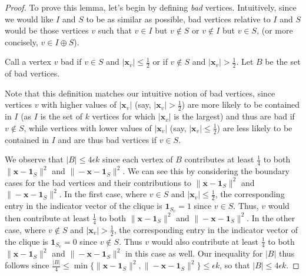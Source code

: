 \documentclass{article}
\begin{document}
\begin{proof}
    To prove this lemma, let's begin by defining \emph{bad} vertices.
    Intuitively, since we would like $I$ and $S$ to be as similar as possible, bad vertices relative to $I$ and $S$ would be those vertices
    $v$ such that $v \in I$ but $v \notin S$ or $v \notin I$ but $v \in S$,
    (or more concisely, $v \in I \oplus S$).
    \begin{definition}
        Call a vertex $v$ bad if $v \in S$ and $|\mathbf{x}_{v}| \leq \frac{1}{2}$ or if $v
        \not\in S$ and $|\mathbf{x}_{v}| > \frac{1}{2}$. Let $B$ be the set of bad vertices.
    \end{definition}
    Note that this definition matches our intuitive notion of bad vertices,
    since vertices $v$ with higher values of $|\mathbf{x}_{v}|$ (say,
    $|\mathbf{x}_{v}| > \frac{1}{2}$) are more likely to be contained in $I$
    (as $I$ is the set of $k$ vertices for which $|\mathbf{x}_{v}|$ is the
    largest)
    and thus are bad if $v \notin S$, while vertices with lower values of
    $|\mathbf{x}_{v}|$ (say, $|\mathbf{x}_{v}| \leq \frac{1}{2}$) are less
    likely to be contained in $I$ and are thus bad vertices if $v \in S$.

    We observe that $|B| \leq 4 \epsilon k$ since each vertex of $B$
    contributes at least $\frac{1}{4}$ to both $\|\mathbf{x} - \mathbf{1}_{S}\|^{2}$ and
    $\|-\mathbf{x} - \mathbf{1}_{S}\|^{2}$. We can see this by considering the boundary
    cases for the bad vertices and their contributions to $\|\mathbf{x} -
    \mathbf{1}_{S}\|^{2}$ and $\|-\mathbf{x} - \mathbf{1}_{S}\|^{2}$. In the first case,
    where $v \in S$ and $|\mathbf{x}_v| \leq \frac{1}{2}$, the corresponding entry in
    the indicator vector of the clique is $\mathbf{1}_{S}_{v} = 1$ since $v \in
    S$. Thus, $v$ would then contribute at least $\frac{1}{4}$ to both $\|\mathbf{x} -
    \mathbf{1}_{S}\|^{2}$ and $\|-\mathbf{x} - \mathbf{1}_{S}\|^{2}$. In the
    other case, where $v \notin S$ and $|\mathbf{x}_{v}| > \frac{1}{2}$, the
    corresponding entry in the indicator vector of the clique is
    $\mathbf{1}_{S}_{v} = 0$ since $v \notin S$. Thus $v$ would also contribute
    at least $\frac{1}{4}$ to both $\|\mathbf{x} -
    \mathbf{1}_{S}\|^{2}$ and $\|-\mathbf{x} - \mathbf{1}_{S}\|^{2}$ in this
    case as well. Our inequality for $|B|$ thus follows since
    $\frac{|B|}{4} \leq \min\{\|\mathbf{x} - \mathbf{1}_{S}\|^{2}, \|-\mathbf{x} - \mathbf{1}_{S}\|^{2}\} \leq
    \epsilon k$, so that $|B| \leq 4 \epsilon k$.


\end{proof}
\end{document}
